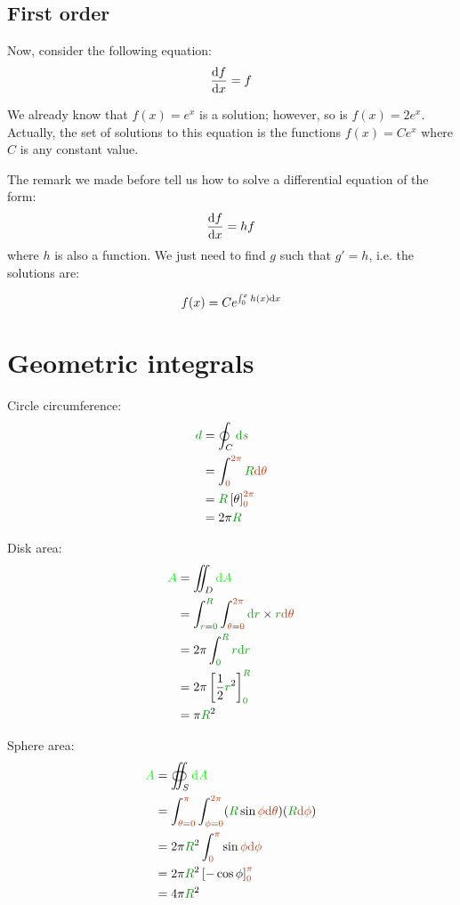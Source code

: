 \subsection{First order}

Now, consider the following equation:
\[
\frac {\mathrm{d} f} {\mathrm{d} x} = f
\]

We already know that $f(x) = e^x$ is a solution; however, so is $f(x) =
2 e^x$. Actually, the set of solutions to this equation is the functions
$f(x) = C e^x$ where $C$ is any constant value.

The remark we made before tell us how to solve a differential equation
of the form:
\[
\frac {\mathrm{d} f} {\mathrm{d} x} = h f
\]
where $h$ is also a function. We just need to find $g$ such that $g' =
h$, i.e. the solutions are:

\[
f(x) = C e^{\int_0^x h(x) \mathrm{d} x}
\]


\section{Geometric integrals}

Circle circumference:
\begin{align*}
\dist{d}
&= \oint_C \dist{\d s}
\\
&= \int_{\angle{0}}^{\angle{2\pi}} \dist{R} \angle{\d \theta}
\\
&= \dist{R} \left[ \theta \right]_{\angle{0}}^{\angle{2\pi}}
\\
&= 2\pi \dist{R}
\\
\end{align*}

Disk area:
\begin{align*}
\area{A}
&= \iint_D \area{\d A}
\\
&= \int_{\dist{r}=\dist{0}}^{\dist{R}}
  \int_{\angle{\theta}=\angle{0}}^{\angle{2\pi}}
  \dist{\d r} \times \dist{r} \angle{\d \theta}
\\
&= 2\pi \int_{\dist{0}}^{\dist{R}} \dist{r} \dist{\d r}
\\
&= 2\pi \left[\frac 1 2 \dist{r}^2\right]_{\dist{0}}^{\dist{R}}
\\
&= \pi \dist{R}^2
\end{align*}

Sphere area:
\begin{align*}
\area{A}
&= \oiint_S \area{\d A}
\\
&= \int_{\angle{\theta}=\angle{0}}^{\angle{\pi}}
  \int_{\angle{\phi}=\angle{0}}^{\angle{2\pi}}
  (\dist{R} \sin \angle{\phi} \angle{\d \theta})
  (\dist{R} \angle{\d \phi})
\\
&= 2\pi \dist{R}^2 \int_{\angle{0}}^{\angle{\pi}} \sin \angle{\phi} \angle{\d \phi}
\\
&= 2\pi \dist{R}^2 \left[ - \cos \phi \right]_{\angle{0}}^{\angle{\pi}}
\\
&= 4\pi \dist{R}^2
\end{align*}

